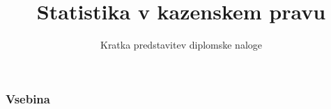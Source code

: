 \documentclass{beamer}
\title[Statistika v kazenskem pravu] 
{Statistika v kazenskem pravu}
\subtitle
{Kratka predstavitev diplomske naloge}
\author[Neža Kržan]
\institute[FMF]{Fakulteta za matematiko in fiziko, Univerza v Ljubljani}
\date[28. november 2022] %
\begin{document}
\begin{frame}
  \titlepage
\end{frame}

\begin{frame}
  \frametitle{Vsebina}
  \tableofcontents[pausesections]
\end{frame}

\end{document}
